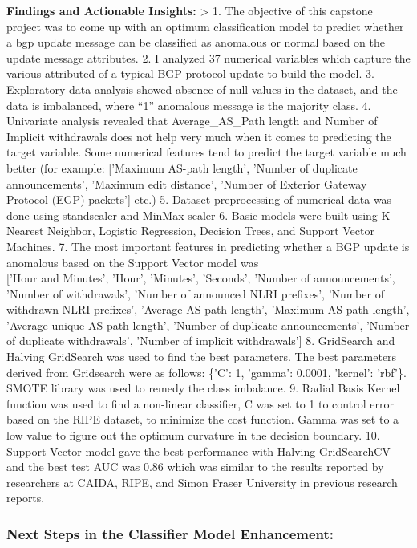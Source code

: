 \documentclass[11pt]{article}
\begin{document}
\textbf{Findings and Actionable Insights:} \textgreater{} 1. The
objective of this capstone project was to come up with an optimum
classification model to predict whether a bgp update message can be
classified as anomalous or normal based on the update message
attributes. 2. I analyzed 37 numerical variables which capture the
various attributed of a typical BGP protocol update to build the model.
3. Exploratory data analysis showed absence of null values in the
dataset, and the data is imbalanced, where ``1'' anomalous message is
the majority class. 4. Univariate analysis revealed that
Average\_AS\_Path length and Number of Implicit withdrawals does not
help very much when it comes to predicting the target variable. Some
numerical features tend to predict the target variable much better (for
example: {[}'Maximum AS-path length', 'Number of duplicate
announcements', 'Maximum edit distance', 'Number of Exterior Gateway
Protocol (EGP) packets'{]} etc.) 5. Dataset preprocessing of numerical
data was done using standscaler and MinMax scaler 6. Basic models were
built using K Nearest Neighbor, Logistic Regression, Decision Trees, and
Support Vector Machines. 7. The most important features in predicting
whether a BGP update is anomalous based on the Support Vector model
was\\
{[}'Hour and Minutes', 'Hour', 'Minutes', 'Seconds', 'Number of
announcements', 'Number of withdrawals', 'Number of announced NLRI
prefixes', 'Number of withdrawn NLRI prefixes', 'Average AS-path
length', 'Maximum AS-path length', 'Average unique AS-path length',
'Number of duplicate announcements', 'Number of duplicate withdrawals',
'Number of implicit withdrawals'{]} 8. GridSearch and Halving GridSearch
was used to find the best parameters. The best parameters derived from
Gridsearch were as follows: \{'C': 1, 'gamma': 0.0001, 'kernel':
'rbf'\}. SMOTE library was used to remedy the class imbalance. 9. Radial
Basis Kernel function was used to find a non-linear classifier, C was
set to 1 to control error based on the RIPE dataset, to minimize the
cost function. Gamma was set to a low value to figure out the optimum
curvature in the decision boundary. 10. Support Vector model gave the
best performance with Halving GridSearchCV and the best test AUC was
0.86 which was similar to the results reported by researchers at CAIDA,
RIPE, and Simon Fraser University in previous research reports.

    \subsubsection{Next Steps in the Classifier Model
Enhancement:}\label{next-steps-in-the-classifier-model-enhancement}
\end{document}
